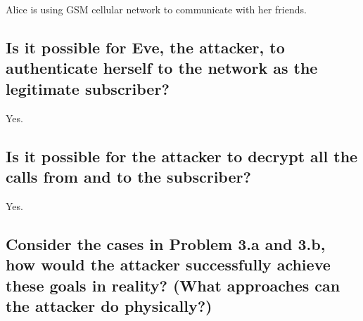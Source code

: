 \documentclass[a4paper]{report}
\begin{document}
Alice is using GSM cellular network to communicate with her friends.

\subsection{Is it possible for Eve, the attacker, to authenticate herself to the network as the
      legitimate subscriber?}

Yes.

\subsection{Is it possible for the attacker to decrypt all the calls from and to the subscriber?}

Yes.

\subsection{Consider the cases in Problem 3.a and 3.b, how would the attacker successfully
      achieve these goals in \textbf{reality}? (What approaches can the attacker do physically?)}
\end{document}
